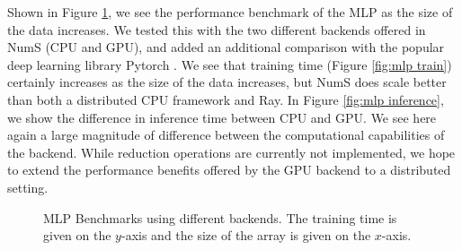 \documentclass{article}
\begin{document}
Shown in Figure \ref{fig:mlp bench}, we see the performance benchmark of the MLP as the size of the data increases. We tested this with the two different backends offered in NumS (CPU and GPU), and added an additional comparison with the popular deep learning library Pytorch \cite{NEURIPS2019_9015}. We see that training time (Figure \ref{fig:mlp train}) certainly increases as the size of the data increases, but NumS does scale better than both a distributed CPU framework and Ray. In Figure \ref{fig:mlp inference}, we show the difference in inference time between CPU and GPU. We see here again a large magnitude of difference between the computational capabilities of the backend. While reduction operations are currently not implemented, we hope to extend the performance benefits offered by the GPU backend to a distributed setting.

\begin{figure}
    \centering
    
    \qquad
    \caption{MLP Benchmarks using different backends. The training time is given on the $y$-axis and the size of the array is given on the $x$-axis.}
    \label{fig:mlp bench}
\end{figure}
\end{document}
